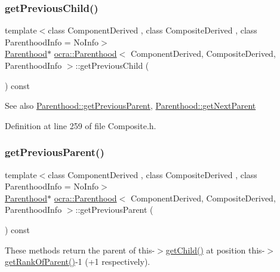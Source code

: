 \subsubsection{\texorpdfstring{get\+Previous\+Child()}{getPreviousChild()}}
{\footnotesize\ttfamily template$<$class Component\+Derived , class Composite\+Derived , class Parenthood\+Info  = No\+Info$>$ \\
\hyperlink{classocra_1_1Parenthood}{Parenthood}$\ast$ \hyperlink{classocra_1_1Parenthood}{ocra\+::\+Parenthood}$<$ Component\+Derived, Composite\+Derived, Parenthood\+Info $>$\+::get\+Previous\+Child (\begin{DoxyParamCaption}{ }\end{DoxyParamCaption}) const\hspace{0.3cm}{\ttfamily [inline]}}

\begin{DoxySeeAlso}{See also}
\hyperlink{classocra_1_1Parenthood_a541a735ce9bca816dde36abc3625c7cc}{Parenthood\+::get\+Previous\+Parent}, \hyperlink{classocra_1_1Parenthood_a550aeaefe0b5901a98e3fb7ca4d4eb9c}{Parenthood\+::get\+Next\+Parent} 
\end{DoxySeeAlso}


Definition at line 259 of file Composite.\+h.

\hypertarget{classocra_1_1Parenthood_a541a735ce9bca816dde36abc3625c7cc}{}\label{classocra_1_1Parenthood_a541a735ce9bca816dde36abc3625c7cc} 
\subsubsection{\texorpdfstring{get\+Previous\+Parent()}{getPreviousParent()}}
{\footnotesize\ttfamily template$<$class Component\+Derived , class Composite\+Derived , class Parenthood\+Info  = No\+Info$>$ \\
\hyperlink{classocra_1_1Parenthood}{Parenthood}$\ast$ \hyperlink{classocra_1_1Parenthood}{ocra\+::\+Parenthood}$<$ Component\+Derived, Composite\+Derived, Parenthood\+Info $>$\+::get\+Previous\+Parent (\begin{DoxyParamCaption}{ }\end{DoxyParamCaption}) const\hspace{0.3cm}{\ttfamily [inline]}}



These methods return the parent of this-\/$>$\hyperlink{classocra_1_1Parenthood_a7056661e3f0e6500141d305e6397f7c0}{get\+Child()} at position this-\/$>$\hyperlink{classocra_1_1Parenthood_a82bb7a676d20350435a07b710de57052}{get\+Rank\+Of\+Parent()}-\/1 (+1 respectively). 

